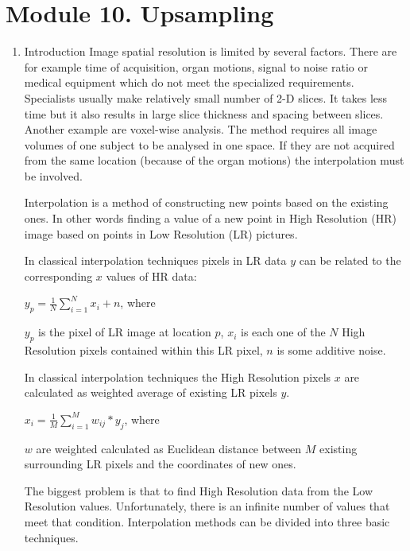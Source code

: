 \section{Module 10. Upsampling}

\begin{enumerate}
\item Introduction
\newline
Image spatial resolution is limited by several factors. There are for example time of acquisition, organ motions, signal to noise ratio or medical equipment which do not meet the specialized requirements. Specialists usually make relatively small number of 2-D slices. It takes less time but it also results in large slice thickness and spacing between slices. Another example are voxel-wise analysis. The method requires all image volumes of one subject to be analysed in one space. If they are not acquired from the same location (because of the organ motions) the interpolation must be involved.

Interpolation is a method of constructing new points based on the
existing ones. In other words finding a value of a new point in High
Resolution (HR) image based on points in Low Resolution (LR) pictures.

In classical interpolation techniques pixels in LR data $y$ can be
related to the corresponding $x$ values of HR data:
\newline
\centerline {$y_{p}=\frac{1}{N}\sum_{i=1}^{N}x_{i}+n$, where }
\newline
\newline $y_{p}$ is the pixel of LR image at location $p$, \newline $x_{i}$ is each one of the $N$ High Resolution pixels contained within this
LR pixel,
\newline $n$ is some additive noise.

In classical interpolation techniques the High Resolution pixels $x$ are calculated as weighted average of existing LR pixels $y$.
\newline \centerline{$x_{i}=\frac{1}{M}\sum_{i=1}^{M}w_{ij}*y_{j}$, where}
\newline
\newline $w$ are weighted calculated as Euclidean distance between $M$ existing surrounding LR pixels and the coordinates of new ones.   

The biggest problem is that to find High Resolution data from the
Low Resolution values. Unfortunately, there is an infinite number
of values that meet that condition. Interpolation methods can be divided
into three basic techniques.


\end{enumerate}
